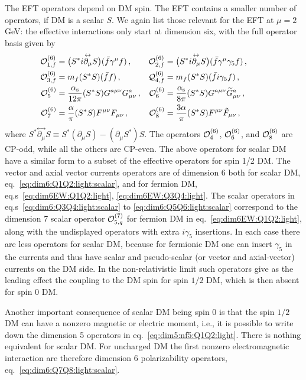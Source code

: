 The EFT operators depend on DM spin.  The EFT contains a smaller number of operators, if DM is a scalar $S$. 
We again list those relevant for the EFT at $\mu=2$ GeV:  the  effective interactions  only start at
dimension six, with the full operator basis given by 
\begin{align}
\label{eq:dim6:Q1Q2:light:scalar}
{\cal O}_{1,f}^{(6)} & = \big(S^* i\overset{\leftrightarrow}{\partial_\mu} S\big) (\bar f \gamma^\mu f)\,,
 &{\cal O}_{2,f}^{(6)} &= \big(S^* i\overset{\leftrightarrow}{\partial_\mu} S\big)(\bar f \gamma^\mu \gamma_5 f)\,, 
 \\
 \label{eq:dim6:Q3Q4:light:scalar}
 {\cal O}_{3,f}^{(6)} & = m_f (S^* S)( \bar f f)\,, 
&{\cal
  Q}_{4,f}^{(6)} &= m_f (S^* S)( \bar f i\gamma_5 f)\,,
\\
\label{eq:dim6:Q5Q6:light:scalar}
  {\cal O}_5^{(6)} & = \frac{\alpha_{\rm s}}{12\pi} (S^* S)
 G^{a\mu\nu}G_{\mu\nu}^a\,, 
 & {\cal O}_6^{(6)} &= \frac{\alpha_{\rm s}}{8\pi} (S^* S) G^{a\mu\nu}\widetilde G_{\mu\nu}^a\,,
\\
  \label{eq:dim6:Q7Q8:light:scalar} 
 {\cal O}_{7}^{(6)} &=\frac{\alpha}{\pi}(S^*
S) F^{\mu\nu}F_{\mu\nu}\,, 
& {\cal O}_{8}^{(6)} &=\frac{3\alpha}{\pi}(S^*
S) F^{\mu\nu} \tilde F_{\mu\nu}\,, &~&
\end{align}
where $S^*\overset{\leftrightarrow}{\partial_\mu}S  \equiv  S^* (\partial_\mu S)- (\partial_\mu S^*)
S$. The operators ${\cal O}_4^{(6)}$, ${\cal O}_6^{(6)}$, and ${\cal O}_8^{(6)}$ are CP-odd, while all the others are CP-even. 
The above operators for scalar DM have a similar form to a subset of the effective operators for spin 1/2 DM. 
The vector and axial vector currents operators  are of dimension 6 both for scalar DM, eq.~\eqref{eq:dim6:Q1Q2:light:scalar}, and for fermion DM, eq.s~\eqref{eq:dim6EW:Q1Q2:light}, \eqref{eq:dim6EW:Q3Q4:light}. 
The scalar operators in eq.s~\eqref{eq:dim6:Q3Q4:light:scalar} to \eqref{eq:dim6:Q5Q6:light:scalar} 
correspond to the dimension 7 scalar operator ${\cal O}_{5,q}^{(7)}$ for fermion DM in eq.~\eqref{eq:dim6EW:Q1Q2:light}, along with the undisplayed operators with extra $i\gamma_5$ insertions.
In each case there are less operators for scalar DM, because for fermionic DM one can insert $\gamma_5$ in the currents and thus have scalar and pseudo-scalar (or vector and axial-vector) currents on the DM side. 
In the non-relativistic limit such operators give as the leading effect the coupling to the DM spin for spin $1/2$ DM, which is then absent for spin 0 DM.

Another important consequence of scalar DM being spin 0 is that the spin $1/2$ DM can have a nonzero magnetic or electric moment, i.e., it is possible to write down the dimension 5 operators in eq.~\eqref{eq:dim5:nf5:Q1Q2:light}. There is nothing equivalent for scalar DM. For uncharged DM the first nonzero electromagnetic interaction are therefore dimension 6 polarizability operators, eq.~\eqref{eq:dim6:Q7Q8:light:scalar}.


